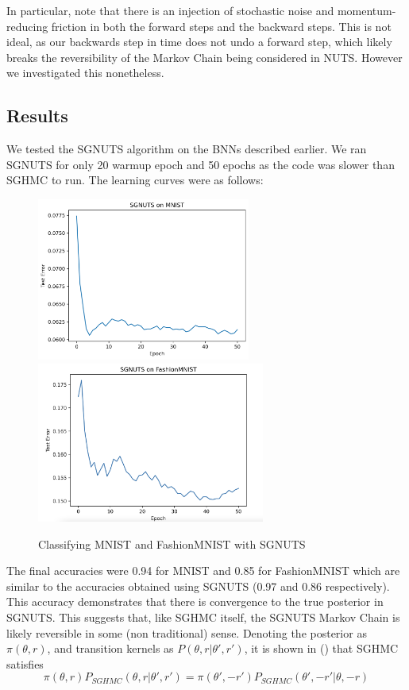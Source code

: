 In particular, note that there is an injection of stochastic noise and momentum-reducing friction in both the forward steps and the backward steps. This is not ideal, as our backwards step in time does not undo a forward step, which likely breaks the reversibility of the Markov Chain being considered in NUTS. However we investigated this nonetheless.

\subsection{Results} 

We tested the SGNUTS algorithm on the BNNs described earlier. We ran SGNUTS for only 20 warmup epoch and 50 epochs as the code was slower than SGHMC to run. The learning curves were as follows:

\begin{figure}[h!]
\centering
\includegraphics[width=70mm]{parts/Images/SGNUTS_MNIST.png}
\includegraphics[width=75mm]{parts/Images/SGNUTS_Fashion.png}
\caption{Classifying MNIST and FashionMNIST with SGNUTS}
\end{figure}

The final accuracies were 0.94 for MNIST and 0.85 for FashionMNIST which are similar to the accuracies obtained using SGNUTS (0.97 and 0.86 respectively). This accuracy demonstrates that there is convergence to the true posterior in SGNUTS. This suggests that, like SGHMC itself, the SGNUTS Markov Chain is likely reversible in some (non traditional) sense. Denoting the posterior as $\pi(\theta, r)$, and transition kernels as $P(\theta, r| \theta', r')$, it is shown in (\cite{sghmc}) that SGHMC satisfies
$$ \pi(\theta,r)P_{SGHMC}(\theta,r|\theta',r') = \pi(\theta',-r')P_{SGHMC}(\theta',-r'|\theta,-r)$$

